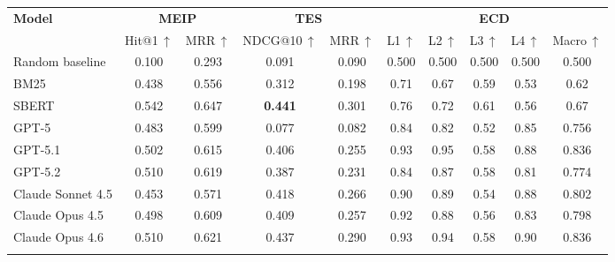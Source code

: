 \documentclass[11pt]{article}
\begin{document}
\begin{table}[!t]
\centering\small
\renewcommand{\arraystretch}{1.08}
\setlength{\tabcolsep}{5pt}


\begin{tabular}{@{}lcc|cc|ccccc@{}}
\toprule
\textbf{Model} &
\multicolumn{2}{c|}{\textbf{MEIP}} &
\multicolumn{2}{c|}{\textbf{TES}} &
\multicolumn{5}{c}{\textbf{ECD}} \\
 & Hit@1\,$\uparrow$ & MRR\,$\uparrow$
 & NDCG@10\,$\uparrow$ & MRR\,$\uparrow$
 & L1\,$\uparrow$ & L2\,$\uparrow$ & L3\,$\uparrow$
 & L4\,$\uparrow$ & Macro\,$\uparrow$ \\
\midrule

Random baseline
& 0.100 & 0.293 & 0.091 & 0.090
& 0.500 & 0.500 & 0.500 & 0.500 & 0.500 \\
\midrule

\rowcolor{baselinegray}
BM25
& 0.438 & 0.556 & 0.312 & 0.198
& 0.71 & 0.67 & 0.59 & 0.53 & 0.62 \\

\rowcolor{baselinegray}
SBERT
& 0.542 & 0.647
& \cellcolor{sota}\textbf{0.441}
& 0.301
& 0.76 & 0.72
& 0.61
& 0.56 & 0.67 \\

\addlinespace[1pt]
\midrule

GPT-5
& 0.483 & 0.599 & 0.077 & 0.082
& 0.84 & 0.82 & 0.52 & 0.85 & 0.756 \\

GPT-5.1
& 0.502 & 0.615 & 0.406 & 0.255
& 0.93 & 0.95 & 0.58 & 0.88 & 0.836 \\

GPT-5.2
& 0.510 & 0.619 & 0.387 & 0.231
& 0.84 & 0.87 & 0.58 & 0.81 & 0.774 \\

\addlinespace[1pt]
\midrule

Claude Sonnet 4.5
& 0.453 & 0.571 & 0.418 & 0.266
& 0.90 & 0.89 & 0.54 & 0.88 & 0.802 \\

Claude Opus 4.5
& 0.498 & 0.609 & 0.409 & 0.257
& 0.92 & 0.88 & 0.56 & 0.83 & 0.798 \\

Claude Opus 4.6
& 0.510 & 0.621
& 0.437
& 0.290
& 0.93 & 0.94 & 0.58 & 0.90 & 0.836 \\


\addlinespace[1pt]
\midrule


\end{tabular}
\end{table}
\end{document}
